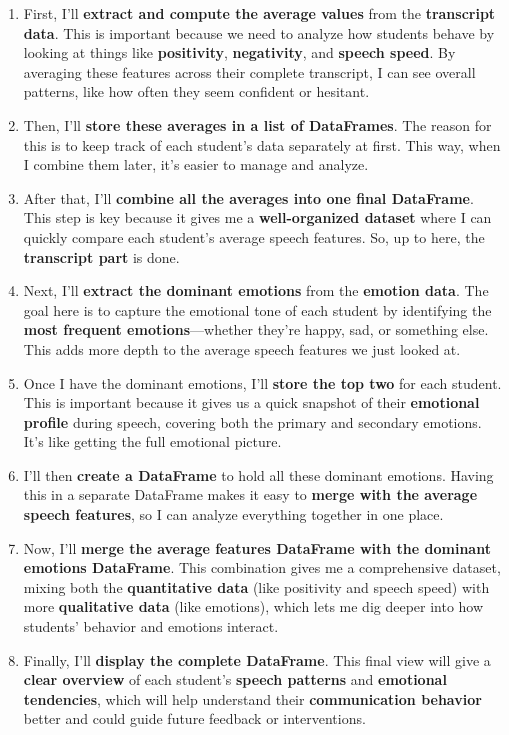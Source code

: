 \documentclass{article}
\newcommand{\highlight}[1]{\textsf{\textbf{#1}}}  %
\begin{document}
\begin{enumerate}
    \item First, I'll \highlight{extract and compute the average values} from the \highlight{transcript data}. This is important because we need to analyze how students behave by looking at things like \highlight{positivity}, \highlight{negativity}, and \highlight{speech speed}. By averaging these features across their complete transcript, I can see overall patterns, like how often they seem confident or hesitant.
    
    \item Then, I’ll \highlight{store these averages in a list of DataFrames}. The reason for this is to keep track of each student’s data separately at first. This way, when I combine them later, it’s easier to manage and analyze.
    
    \item After that, I’ll \highlight{combine all the averages into one final DataFrame}. This step is key because it gives me a \highlight{well-organized dataset} where I can quickly compare each student’s average speech features. So, up to here, the \highlight{transcript part} is done.
    
    \item Next, I’ll \highlight{extract the dominant emotions} from the \highlight{emotion data}. The goal here is to capture the emotional tone of each student by identifying the \highlight{most frequent emotions}—whether they're happy, sad, or something else. This adds more depth to the average speech features we just looked at.
    
    \item Once I have the dominant emotions, I’ll \highlight{store the top two} for each student. This is important because it gives us a quick snapshot of their \highlight{emotional profile} during speech, covering both the primary and secondary emotions. It’s like getting the full emotional picture.
    
    \item I’ll then \highlight{create a DataFrame} to hold all these dominant emotions. Having this in a separate DataFrame makes it easy to \highlight{merge with the average speech features}, so I can analyze everything together in one place.
    
    \item Now, I’ll \highlight{merge the average features DataFrame with the dominant emotions DataFrame}. This combination gives me a comprehensive dataset, mixing both the \highlight{quantitative data} (like positivity and speech speed) with more \highlight{qualitative data} (like emotions), which lets me dig deeper into how students' behavior and emotions interact.
    
    \item Finally, I’ll \highlight{display the complete DataFrame}. This final view will give a \highlight{clear overview} of each student's \highlight{speech patterns} and \highlight{emotional tendencies}, which will help understand their \highlight{communication behavior} better and could guide future feedback or interventions.
\end{enumerate}
\end{document}
